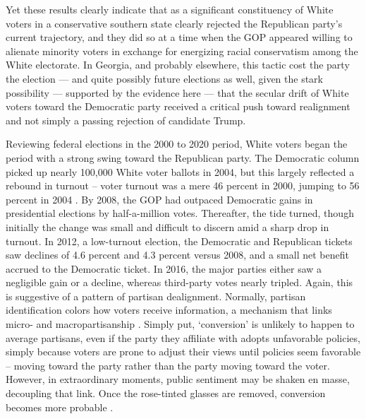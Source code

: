 Yet these results clearly indicate that as a significant constituency of White voters in a conservative southern state clearly rejected the Republican party's current trajectory, and they did so at a time when the GOP appeared willing to alienate minority voters in exchange for energizing racial conservatism among the White electorate. In Georgia, and probably elsewhere, this tactic cost the party the election --- and quite possibly future elections as well, given the stark possibility --- supported by the evidence here --- that the secular drift of White voters toward the Democratic party received a critical push toward realignment and not simply a passing rejection of candidate Trump. 

Reviewing federal elections in the 2000 to 2020 period, White voters began the period with a strong swing toward the Republican party. The Democratic column picked up nearly 100,000 White voter ballots in 2004, but this largely reflected a rebound in turnout -- voter turnout was a mere 46 percent in 2000, jumping to 56 percent in 2004 \citep{mcdonald_united_2021}. By 2008, the GOP had outpaced Democratic gains in presidential elections by half-a-million votes. Thereafter, the tide turned, though initially the change was small and difficult to discern amid a sharp drop in turnout. In 2012, a low-turnout election, the Democratic and Republican tickets saw declines of 4.6 percent and 4.3 percent versus 2008, and a small net benefit accrued to the Democratic ticket. In 2016, the major parties either saw a negligible gain or a decline, whereas third-party votes nearly tripled. Again, this is suggestive of a pattern of partisan dealignment. Normally, partisan identification colors how voters receive information, a mechanism that links micro- and macropartisanship \citep{carsey_changing_2006}. Simply put, `conversion' is unlikely to happen to average partisans, even if the party they affiliate with adopts unfavorable policies, simply because voters are prone to adjust their views until policies seem favorable -- moving toward the party rather than the party moving toward the voter. However, in extraordinary moments, public sentiment may be shaken en masse, decoupling that link. Once the rose-tinted glasses are removed, conversion becomes more probable \citep{darmofal_dynamics_2010}. 

